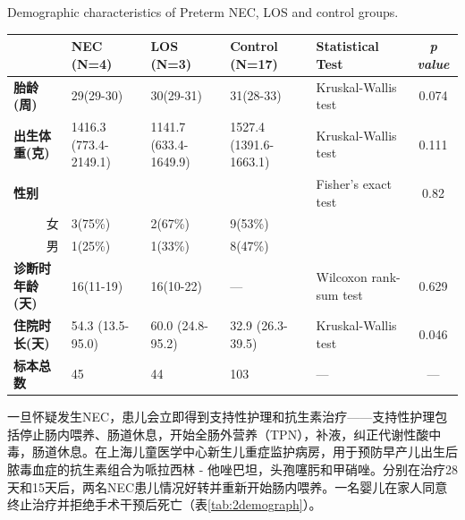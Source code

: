     \begin{table}[!hpb]
      \centering
        {Demographic characteristics of Preterm NEC, LOS and control groups.}
      \label{tab:necdemographic}
      \begin{tabular}{lp{1.8cm}p{1.8cm}p{1.8cm}p{2cm}c}
        \toprule
           & \textbf{NEC (N=4)} & \textbf{LOS (N=3)} & \textbf{Control (N=17)} & \textbf{Statistical Test} & \textit{p value} \\ \midrule
          \textbf{胎龄(周)} & 29(29-30) & 30(29-31) & 31(28-33) & Kruskal-Wallis test & 0.074 \\
          \textbf{出生体重(克)} & 1416.3 (773.4-2149.1) & 1141.7 (633.4-1649.9) & 1527.4 (1391.6-1663.1) & Kruskal-Wallis test & 0.111 \\
          \textbf{性别} &  &  &  & Fisher's exact test & 0.82 \\
          \multicolumn{1}{r}{女} & 3(75\%) & 2(67\%) & 9(53\%) &  & \\
          \multicolumn{1}{r}{男} & 1(25\%) & 1(33\%) & 8(47\%) &  & \\
          \textbf{诊断时年龄(天)} & 16(11-19) & 16(10-22) & — & Wilcoxon rank-sum test & 0.629 \\
          \textbf{住院时长(天)} & 54.3 (13.5-95.0) & 60.0 (24.8-95.2) & 32.9 (26.3-39.5) & Kruskal-Wallis test & 0.046 \\
          \textbf{标本总数} & 45 & 44 & 103 & — & — \\ \bottomrule
      \end{tabular}
    \end{table}


    一旦怀疑发生NEC，患儿会立即得到支持性护理和抗生素治疗——支持性护理包括停止肠内喂养、肠道休息，开始全肠外营养（TPN），补液，纠正代谢性酸中毒，肠道休息。在上海儿童医学中心新生儿重症监护病房，用于预防早产儿出生后脓毒血症的抗生素组合为哌拉西林 - 他唑巴坦，头孢噻肟和甲硝唑。分别在治疗28天和15天后，两名NEC患儿情况好转并重新开始肠内喂养。一名婴儿在家人同意终止治疗并拒绝手术干预后死亡（表\ref{tab:2demograph}）。

